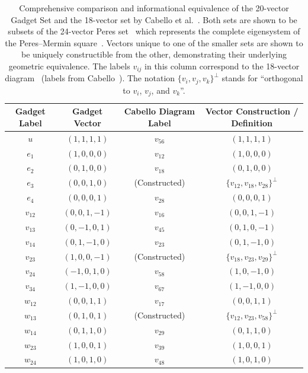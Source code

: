 \documentclass[%
  reprint,
  superscriptaddress,
  showpacs,
  showkeys,
  amsmath,amssymb,
  pra,
  longbibliography,
  floatfix,
  x11names
]{revtex4-2}
\begin{document}
\begin{table}[ht]
\caption{Comprehensive comparison and informational equivalence of the 20-vector Gadget Set
and the 18-vector set by Cabello et al.~\cite{cabello-96,cabello:210401}.
Both sets are shown to be subsets of the 24-vector
Peres set~\cite{peres111,mermin90b,peres-91}
which represents the complete eigensystem of the Peres--Mermin square~\cite{pavicic-2004ksafq,svozil-2024-convert-pra-externalfigures}.
Vectors unique to one of the smaller sets are shown to be uniquely constructible from the other,
demonstrating their underlying geometric equivalence.
The labels $v_{ij}$ in this column correspond to the 18-vector diagram~\cite{cabello-96}
(labels from Cabello~\cite{cabello:210401}).
The notation
$\{v_{i}, v_{j}, v_{k}\}^\perp$ stands for ``orthogonal to $v_{i}$, $v_{j}$, and $v_{k}$''.}
\label{tab:vector-equivalence}
\begin{ruledtabular}
\begin{tabular}{cccc}
Gadget Label & Gadget Vector & Cabello Diagram Label & Vector Construction / Definition \\
\hline
$u$ & $(1,1,1,1)$ & $v_{56}$ & $(1,1,1,1)$ \\
$e_1$ & $(1,0,0,0)$ & $v_{12}$ & $(1,0,0,0)$ \\
$e_2$ & $(0,1,0,0)$ & $v_{18}$ & $(0,1,0,0)$ \\
$e_3$ & $(0,0,1,0)$ & (Constructed) & $\{v_{12}, v_{18}, v_{28}\}^\perp$ \\
$e_4$ & $(0,0,0,1)$ & $v_{28}$ & $(0,0,0,1)$ \\
\hline
$v_{12}$ & $(0,0,1,-1)$ & $v_{16}$ & $(0,0,1,-1)$ \\
$v_{13}$ & $(0,-1,0,1)$ & $v_{45}$ & $(0,1,0,-1)$ \\
$v_{14}$ & $(0,1,-1,0)$ & $v_{23}$ & $(0,1,-1,0)$ \\
$v_{23}$ & $(1,0,0,-1)$ & (Constructed) & $\{v_{18}, v_{23}, v_{29}\}^\perp$ \\
$v_{24}$ & $(-1,0,1,0)$ & $v_{58}$ & $(1,0,-1,0)$ \\
$v_{34}$ & $(1,-1,0,0)$ & $v_{67}$ & $(1,-1,0,0)$ \\
\hline
$w_{12}$ & $(0,0,1,1)$ & $v_{17}$ & $(0,0,1,1)$ \\
$w_{13}$ & $(0,1,0,1)$ & (Constructed) & $\{v_{12}, v_{23}, v_{58}\}^\perp$ \\
$w_{14}$ & $(0,1,1,0)$ & $v_{29}$ & $(0,1,1,0)$ \\
$w_{23}$ & $(1,0,0,1)$ & $v_{39}$ & $(1,0,0,1)$ \\
$w_{24}$ & $(1,0,1,0)$ & $v_{48}$ & $(1,0,1,0)$ \\

\end{tabular}
\end{ruledtabular}
\end{table}
\end{document}
